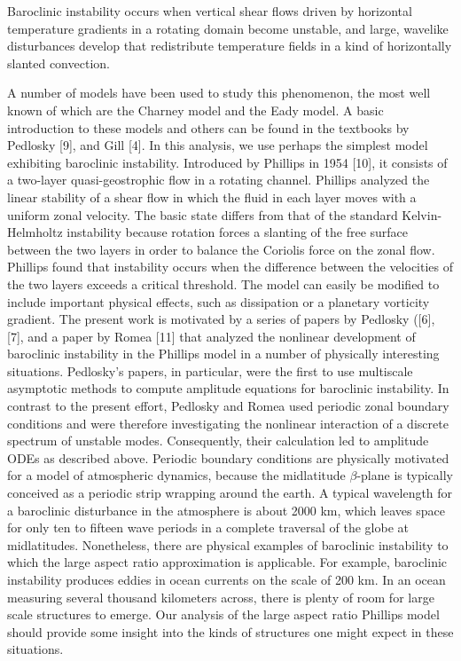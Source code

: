 
Baroclinic instability occurs when vertical shear flows driven by
horizontal temperature gradients in a rotating domain become unstable,
and large, wavelike disturbances develop that redistribute temperature
fields in a kind of horizontally slanted convection.

A number of models have been used to study this phenomenon, the most well
known of which are the Charney model and the Eady model. A basic
introduction to these models and others can be found in the textbooks by
Pedlosky [9], and Gill [4]. In this analysis, we use perhaps the simplest
model exhibiting baroclinic instability. Introduced by Phillips in 1954
[10], it consists of a two-layer quasi-geostrophic flow in a rotating
channel.
Phillips analyzed the linear stability of a shear flow in which the fluid
in each layer moves with a uniform zonal velocity. The basic state
differs from that of the standard Kelvin-Helmholtz instability because
rotation forces a slanting of the free surface between the two layers in
order to balance the Coriolis force on the zonal flow. Phillips found
that instability occurs when the difference between the velocities of the
two layers exceeds a critical threshold. The model can easily be modified
to include important physical effects, such as dissipation or a planetary
vorticity gradient. The present work is motivated by a series of papers
by Pedlosky ([6], [7], and a paper by Romea [11] that analyzed the
nonlinear development of baroclinic instability in the Phillips model in
a number of physically interesting situations. Pedlosky's papers, in
particular, were the first to use multiscale asymptotic methods to
compute amplitude equations for baroclinic instability. In contrast to
the present effort, Pedlosky and Romea used periodic zonal boundary
conditions and were therefore investigating the nonlinear interaction of
a discrete spectrum of unstable modes. Consequently, their calculation
led to amplitude ODEs as described above. Periodic boundary conditions
are physically motivated for a model of atmospheric dynamics, because the
midlatitude $\beta$-plane is typically conceived as a periodic strip wrapping
around the earth. A typical wavelength for a baroclinic disturbance in
the atmosphere is about 2000 km, which leaves space for only ten to
fifteen wave periods in a complete traversal of the globe at
midlatitudes. Nonetheless, there are physical examples of baroclinic
instability to which the large aspect ratio approximation is applicable.
For example, baroclinic instability produces eddies in ocean currents on
the scale of 200 km. In an ocean measuring several thousand kilometers
across, there is plenty of room for large scale structures to emerge. Our
analysis of the large aspect ratio Phillips model should provide some
insight into the kinds of structures one might expect in these
situations.

